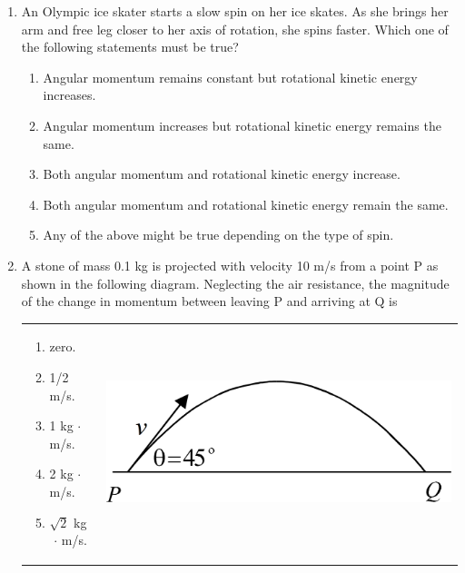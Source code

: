 \documentclass[12pt,letterpaper]{article}
\begin{document}
\begin{enumerate}
\item
An Olympic ice skater starts a slow spin on her ice skates. As she brings her arm and free leg closer to her axis of rotation, she spins faster. Which one of the following statements must be true?
\begin{enumerate}
\item Angular momentum remains constant but rotational kinetic energy increases.
\item Angular momentum increases but rotational kinetic energy remains the same.
\item Both angular momentum and rotational kinetic energy increase.
\item Both angular momentum and rotational kinetic energy remain the same.
\item Any of the above might be true depending on the type of spin.
\end{enumerate}

\item
A stone of mass 0.1 kg is projected with velocity 10 m/s from a point P as shown in the following diagram. Neglecting the air resistance, the magnitude of the change in momentum between leaving P and arriving at Q is

\begin{tabular}{l r}

\begin{minipage}{0.5\textwidth}
\begin{enumerate}
\item zero.
\item 1/2 m/s.
\item 1 kg$\,\cdot\,$m/s.
\item 2 kg$\,\cdot\,$m/s.
\item $\sqrt{2}$ kg$\,\cdot\,$m/s.
\end{enumerate}
\end{minipage} &
\begin{minipage}{0.4\textwidth}
\includegraphics[width=\textwidth]{momentum.png}
\end{minipage}
\end{tabular}


\end{enumerate}
\end{document}
